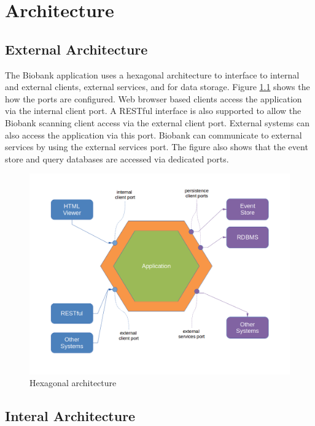 \chapter{Architecture}

\section{External Architecture}

The Biobank application uses a hexagonal architecture to interface to internal
and external clients, external services, and for data storage. Figure
\ref{fig:hex-architecture} shows the how the ports are configured. Web browser
based clients access the application via the internal client port. A RESTful
interface is also supported to allow the Biobank scanning client access via the
external client port. External systems can also access the application via this
port. Biobank can communicate to external services by using the external
services port. The figure also shows that the event store and query databases
are accessed via dedicated ports.

\begin{figure}[h]
\includegraphics[width=1\textwidth]{images/hex-architecture}
\caption{Hexagonal architecture}
\label{fig:hex-architecture}
\end{figure}

\section{Interal Architecture}

